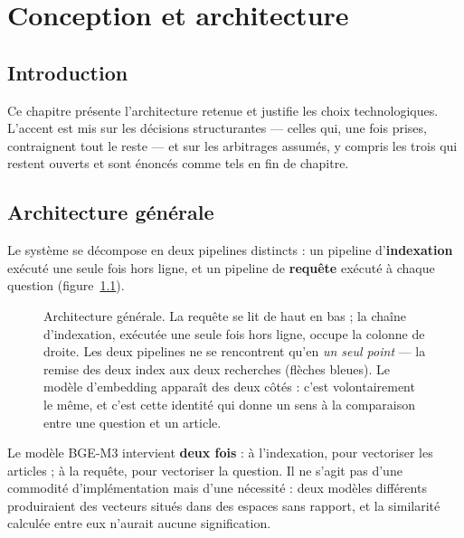 \chapter{Conception et architecture}
\label{chap:conception}

\section*{Introduction}

Ce chapitre présente l'architecture retenue et justifie les choix technologiques. L'accent est mis
sur les décisions structurantes --- celles qui, une fois prises, contraignent tout le reste --- et
sur les arbitrages assumés, y compris les trois qui restent ouverts et sont énoncés comme tels en
fin de chapitre.

\section{Architecture générale}

Le système se décompose en deux pipelines distincts : un pipeline d'\textbf{indexation} exécuté
une seule fois hors ligne, et un pipeline de \textbf{requête} exécuté à chaque question
(figure~\ref{fig:architecture}).

\begin{figure}[htbp]
  \centering
  
  \caption[Architecture générale du système]{Architecture générale. La requête se lit de haut en
  bas ; la chaîne d'indexation, exécutée une seule fois hors ligne, occupe la colonne de droite.
  Les deux pipelines ne se rencontrent qu'en \emph{un seul point} --- la remise des deux index aux
  deux recherches (flèches bleues). Le modèle d'embedding apparaît des deux côtés : c'est
  volontairement le même, et c'est cette identité qui donne un sens à la comparaison entre une
  question et un article.}
  \label{fig:architecture}
\end{figure}

\medskip
\centerline{\legendeschema}
\medskip

Le modèle BGE-M3 intervient \textbf{deux fois} : à l'indexation, pour vectoriser les articles ; à
la requête, pour vectoriser la question. Il ne s'agit pas d'une commodité d'implémentation mais
d'une nécessité : deux modèles différents produiraient des vecteurs situés dans des espaces sans
rapport, et la similarité calculée entre eux n'aurait aucune signification.

